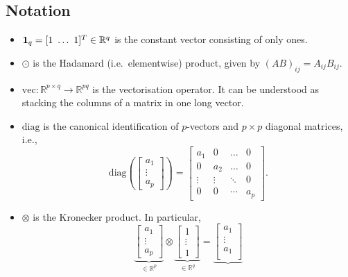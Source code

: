\documentclass{article}
\begin{document}
\subsection{Notation}
\begin{itemize}
    \item $\vb{1}_q = [1\,\, \dots\,\, 1]^T \in \mathbb{R}^q$ is the constant vector consisting of only ones.
    \item $\odot$ is the Hadamard (i.e.\, elementwise) product, given by $(AB)_{ij} = A_{ij} B_{ij}$.
    \item $\mathrm{vec}: \mathbb{R}^{p \times q} \rightarrow \mathbb{R}^{pq}$ is the vectorisation operator. It can be understood as stacking the columns of a matrix in one long vector. 
    \item $\mathrm{diag}$ is the canonical identification of $p$-vectors and $p \times p$ diagonal matrices, i.e.,
    $$
    \mathrm{diag}\left(
    \begin{bmatrix}
        a_1 \\ 
        \vdots \\
        a_p
    \end{bmatrix}
    \right)
    =
    \begin{bmatrix}
        a_1 & 0 & \dots & 0 \\
        0 & a_2 & \dots & 0 \\
        \vdots & \vdots & \ddots & 0 \\
        0 & 0 & \cdots & a_p
    \end{bmatrix}
    .$$
    \item $\otimes$ is the Kronecker product. In particular,
        $$
        \underbrace{
        \begin{bmatrix}
            a_1 \\
            \vdots \\
            a_p
        \end{bmatrix}
        }_{\in \mathbb{R}^{p}}
        \otimes 
        \underbrace{
        \begin{bmatrix}
            1 \\
            \vdots \\
            1
        \end{bmatrix}
        }_{\in \mathbb{R}^{q}}
        =
        \underbrace{
        \begin{bmatrix}
            a_1 \\
            \vdots \\
            a_1 \\

\end{bmatrix}}$$
\end{itemize}
\end{document}
